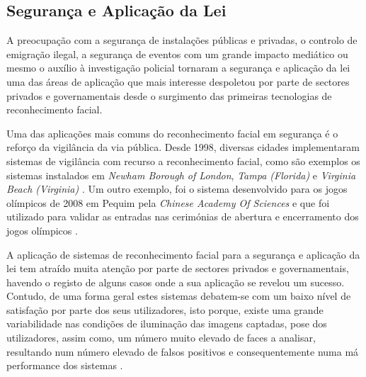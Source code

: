 \subsection{Segurança e Aplicação da Lei} \label{sec:SegurancaAplicaçãoLei}
A preocupação com a segurança de instalações públicas e privadas, o controlo de emigração ilegal, a segurança de eventos com um grande impacto mediático ou mesmo o auxílio à investigação policial tornaram a segurança e aplicação da lei uma das áreas de aplicação que mais interesse despoletou por parte de sectores privados e governamentais desde o surgimento das primeiras tecnologias de reconhecimento facial.

Uma das aplicações mais comuns do reconhecimento facial em segurança é o reforço da vigilância da via pública. Desde 1998, diversas cidades implementaram sistemas de vigilância com recurso a reconhecimento facial, como são exemplos os sistemas instalados em \textit{Newham Borough of London}, \textit{Tampa (Florida)} e \textit{Virginia Beach (Virginia)} \citep{Li2011}.
Um outro exemplo, foi o sistema desenvolvido para os jogos olímpicos de 2008 em Pequim pela \textit{Chinese Academy Of Sciences} e que foi utilizado para validar as entradas nas cerimónias de abertura e encerramento dos jogos olímpicos \cite{ChineseAcademyOfSciences}.

A aplicação de sistemas de reconhecimento facial para a segurança e aplicação da lei tem atraído muita atenção por parte de sectores privados e governamentais, havendo o registo de alguns casos onde a sua aplicação se revelou um sucesso. Contudo, de uma forma geral estes sistemas debatem-se com um baixo nível de satisfação por parte dos seus utilizadores, isto porque, existe uma grande variabilidade nas condições de iluminação das imagens captadas, pose dos utilizadores, assim como, um número muito elevado de faces a analisar, resultando num número elevado de falsos positivos e consequentemente numa má performance dos sistemas \citep{Li2011}.


